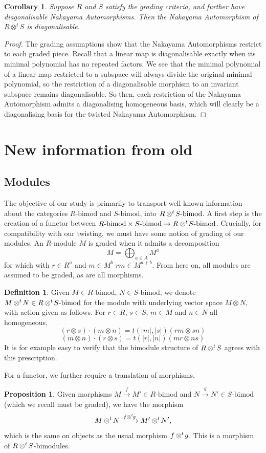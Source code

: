 \documentclass{article}
\newcommand{\ten}{\otimes}
\newcommand{\bimods}{\textrm{-bimod}}
\newcommand{\bigmods}{\textrm{-bimod}}
\newcommand{\twisten}{\otimes^t\hspace{-1pt}}
\theoremstyle{plain}
\newtheorem{corollary}[theorem]{Corollary}
\theoremstyle{definition}
\newtheorem{defn}[theorem]{Definition}
\newtheorem{proposition}[theorem]{Proposition}
\begin{document}
\begin{corollary} Suppose $R$ and $S$ satisfy the grading criteria, and further have diagonalisable Nakayama Automorphisms. Then the Nakayama Automorphism of $R\otimes^t S$ is diagonalisable.
\end{corollary}
\begin{proof}
The grading assumptions show that the Nakayama Automorphisms restrict to each graded piece. Recall that a linear map is diagonalisable exactly when its minimal polynomial has no repeated factors. We see that the minimal polynomial of a linear map restricted to a subspace will always divide the original minimal polynomial, so the restriction of a diagonalisable morphism to an invariant subspace remains diagonalisable. So then, each restriction of the Nakayama Automorphism admits a diagonalising homogeneous basis, which will clearly be a diagonalising basis for the twisted Nakayama Automorphism.
\end{proof}
\section{New information from old}
\subsection{Modules}
The objective of our study is primarily to transport well known information about the categories $R\bimods$ and $S\bimods$, into $R \twisten S \bimods$. A first step is the creation of a functor between $R\bimods \times S\bimods \rightarrow R \twisten S\bimods$. Crucially, for compatibility with our twisting, we must have some notion of grading of our modules. An $R$-module $M$ is graded when it admits a decomposition
$$M = \bigoplus_{a \in A} M^a$$
for which with $r\in R^a$ and $m \in M^b$ $rm \in M^{a+b}$. From here on, all modules are assumed to be graded, as are all morphisms.


\begin{defn}Given $M \in R\bigmods$, $N \in S\bigmods$, we denote $M \twisten N \in R \twisten S \bigmods$ for the module with underlying vector space $M \ten N$, with action given as follows. For $r \in R$, $s \in S$, $m \in M$ and $n \in N$ all homogeneous, 
$$(r \otimes s) \cdot(m \otimes n) = t(|m|,|s|)(rm \otimes sn)$$
$$ (m \otimes n)\cdot(r \otimes s) = t(|r|,|n|)(mr \otimes ns)$$
It is for example easy to verify that the bimodule structure of $R \twisten S$ agrees with this prescription.
\end{defn}
For a functor, we further require a translation of morphisms. 
\begin{proposition}
Given morphisms $M \xrightarrow{f} M' \in R\bigmods$ and $N \xrightarrow{g} N' \in S\bigmods$ (which we recall must be graded), we have the morphism
$$M \twisten N \xrightarrow{f \twisten g} M' \twisten N',$$
which is the same on objects as the usual morphism $f \twisten g$. This is a morphism of $R \twisten S$-bimodules.

\end{proposition}
\end{document}
